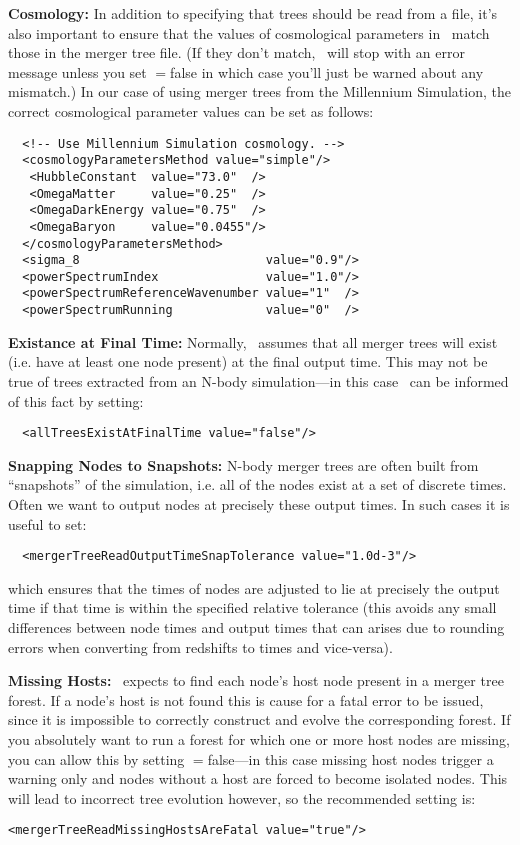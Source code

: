 {\bf Cosmology:} In addition to specifying that trees should be read from a file, it's also important to ensure that the values of cosmological parameters in \glc\ match those in the merger tree file. (If they don't match, \glc\ will stop with an error message unless you set {\normalfont \ttfamily [mergerTreeReadMismatchIsFatal]}$=${\normalfont \ttfamily false} in which case you'll just be warned about any mismatch.) In our case of using merger trees from the Millennium Simulation, the correct cosmological parameter values can be set as follows:
\begin{verbatim}
  <!-- Use Millennium Simulation cosmology. -->
  <cosmologyParametersMethod value="simple"/>
   <HubbleConstant  value="73.0"  />
   <OmegaMatter     value="0.25"  />
   <OmegaDarkEnergy value="0.75"  />
   <OmegaBaryon     value="0.0455"/>
  </cosmologyParametersMethod>
  <sigma_8                          value="0.9"/>
  <powerSpectrumIndex               value="1.0"/>
  <powerSpectrumReferenceWavenumber value="1"  />
  <powerSpectrumRunning             value="0"  />
\end{verbatim}

{\bf Existance at Final Time:} Normally, \glc\ assumes that all merger trees will exist (i.e. have at least one node present) at the final output time. This may not be true of trees extracted from an N-body simulation---in this case \glc\ can be informed of this fact by setting:
\begin{verbatim}
  <allTreesExistAtFinalTime value="false"/>
\end{verbatim}

{\bf Snapping Nodes to Snapshots:} N-body merger trees are often built from ``snapshots'' of the simulation, i.e. all of the nodes exist at a set of discrete times. Often we want to output nodes at precisely these output times. In such cases it is useful to set:
\begin{verbatim}
  <mergerTreeReadOutputTimeSnapTolerance value="1.0d-3"/>
\end{verbatim}
which ensures that the times of nodes are adjusted to lie at precisely the output time if that time is within the specified relative tolerance (this avoids any small differences between node times and output times that can arises due to rounding errors when converting from redshifts to times and vice-versa).

{\bf Missing Hosts:} \glc\ expects to find each \gls{node}'s host \gls{node} present in a merger tree \gls{forest}. If a \gls{node}'s host is not found this is cause for a fatal error to be issued, since it is impossible to correctly construct and evolve the corresponding \gls{forest}. If you absolutely want to run a \gls{forest} for which one or more host \glspl{node} are missing, you can allow this by setting {\normalfont \ttfamily [mergerTreeReadMissingHostsAreFatal]}$=${\normalfont \ttfamily false}---in this case missing host \glspl{node} trigger a warning only and \glspl{node} without a host are forced to become isolated \glspl{node}. This will lead to incorrect tree evolution however, so the recommended setting is:
\begin{verbatim}
<mergerTreeReadMissingHostsAreFatal value="true"/>
\end{verbatim}

